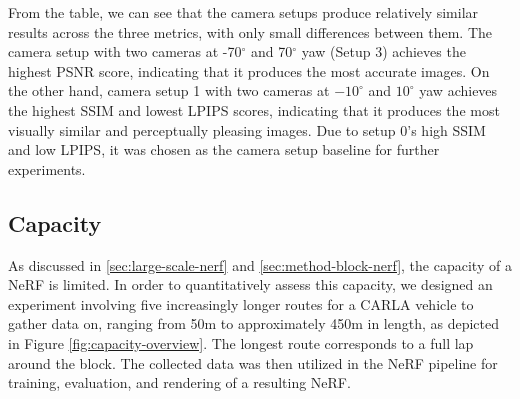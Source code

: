 From the table, we can see that the camera setups produce relatively similar results across the three metrics, with only small differences between them. The camera setup with two cameras at -70$^{\circ}$ and 70$^{\circ}$ yaw (Setup 3) achieves the highest PSNR score, indicating that it produces the most accurate images. On the other hand, camera setup 1 with two cameras at $-10^{\circ}$ and $10^{\circ}$ yaw achieves the highest SSIM and lowest LPIPS scores, indicating that it produces the most visually similar and perceptually pleasing images. Due to setup 0's high SSIM and low LPIPS, it was chosen as the camera setup baseline for further experiments.




























\subsection{Capacity} \label{sec:exp-capacity}
As discussed in \autoref{sec:large-scale-nerf} and \autoref{sec:method-block-nerf}, the capacity of a NeRF is limited. In order to quantitatively assess this capacity, we designed an experiment involving five increasingly longer routes for a CARLA vehicle to gather data on, ranging from 50m to approximately 450m in length, as depicted in Figure \ref{fig:capacity-overview}. The longest route corresponds to a full lap around the block. The collected data was then utilized in the NeRF pipeline for training, evaluation, and rendering of a resulting NeRF.

